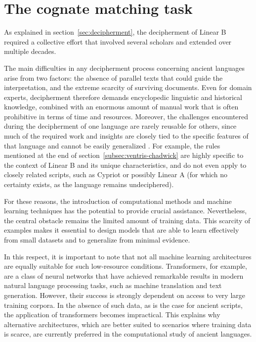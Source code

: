 \chapter{The cognate matching task}
As explained in section~\ref{sec:decipherment}, the decipherment of Linear B required a collective effort that involved several scholars and extended over multiple decades.

The main difficulties in any decipherment process concerning ancient languages arise from two factors: the absence of parallel texts that could guide the interpretation, and the extreme scarcity of surviving documents.
Even for domain experts, decipherment therefore demands encyclopedic linguistic and historical knowledge, combined with an enormous amount of manual work that is often prohibitive in terms of time and resources.
Moreover, the challenges encountered during the decipherment of one language are rarely reusable for others, since much of the required work and insights are closely tied to the specific features of that language and cannot be easily generalized \cite{luo}.
For example, the rules mentioned at the end of section~\ref{subsec:ventris-chadwick} are highly specific to the context of Linear B and its unique characteristics, and do not even apply to closely related scripts, such as Cypriot or possibly Linear A (for which no certainty exists, as the language remains undeciphered).

For these reasons, the introduction of computational methods and machine learning techniques has the potential to provide crucial assistance.
Nevertheless, the central obstacle remains the limited amount of training data.
This scarcity of examples makes it essential to design models that are able to learn effectively from small datasets and to generalize from minimal evidence.

In this respect, it is important to note that not all machine learning architectures are equally suitable for such low-resource conditions.
Transformers, for example, are a class of neural networks that have achieved remarkable results in modern natural language processing tasks, such as machine translation and text generation.
However, their success is strongly dependent on access to very large training corpora.
In the absence of such data, as is the case for ancient scripts, the application of transformers becomes impractical.
This explains why alternative architectures, which are better suited to scenarios where training data is scarce, are currently preferred in the computational study of ancient languages.

